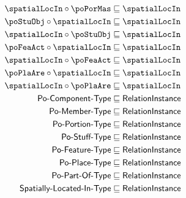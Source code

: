 \begin{align}
\spatialLocIn\circ \poPorMas&\sqsubseteq\spatialLocIn\\
\poStuObj\circ\spatialLocIn&\sqsubseteq \spatialLocIn\\
\spatialLocIn\circ \poStuObj&\sqsubseteq\spatialLocIn\\
\poFeaAct\circ\spatialLocIn&\sqsubseteq \spatialLocIn\\
\spatialLocIn\circ \poFeaAct&\sqsubseteq\spatialLocIn\\
\poPlaAre\circ\spatialLocIn&\sqsubseteq \spatialLocIn\\
\spatialLocIn\circ \poPlaAre&\sqsubseteq\spatialLocIn\\
\textsf{Po-Component-Type}         &\sqsubseteq \textsf{RelationInstance} \\
\textsf{Po-Member-Type}            &\sqsubseteq \textsf{RelationInstance} \\
\textsf{Po-Portion-Type}           &\sqsubseteq \textsf{RelationInstance} \\
\textsf{Po-Stuff-Type}             &\sqsubseteq \textsf{RelationInstance} \\
\textsf{Po-Feature-Type}           &\sqsubseteq \textsf{RelationInstance} \\
\textsf{Po-Place-Type}             &\sqsubseteq \textsf{RelationInstance} \\
\textsf{Po-Part-Of-Type}           &\sqsubseteq \textsf{RelationInstance} \\
\textsf{Spatially-Located-In-Type} &\sqsubseteq \textsf{RelationInstance}
\end{align}


